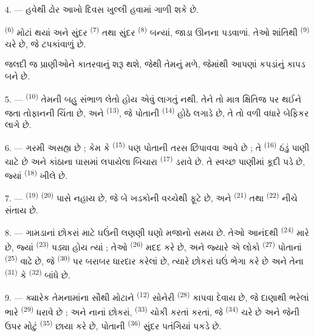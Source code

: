4. --- હવેથી ઢોર આખો દિવસ ખુલ્લી હવામાં ગાળી શકે છે.

 \textsuperscript{(6)} મોટાં થયાં અને સુંદર
 \textsuperscript{(7)} તથા સુંદર 
\textsuperscript{(8)} બન્યાં, જાડા ઊનના પડવાળાં. તેઓ શાંતિથી
 \textsuperscript{(9)}  ચરે છે, જે
 ટપકાંવાળું છે.

જલદી જ  પ્રાણીઓને કાતરવાનું શરૂ થશે, જેથી તેમનું 
મળે, જેમાંથી આપણાં કપડાંનું કાપડ બને છે.

\VUsaut{5.0mm}
\VUsaut{3.4mm}

5. ---  \textsuperscript{(10)} તેમની બહુ સંભાળ લેતો હોય
એવું લાગતું નથી. તેને તો માત્ર ક્ષિતિજ પર થઈને જતા તોફાનની ચિંતા છે, અને
 \textsuperscript{(13)}, જે પોતાની
 \textsuperscript{(14)} હોઠે લગાડે છે, તે તો વળી વધારે
બેફિકર લાગે છે.

6. --- ગરમી અસહ્ય છે ; કેમ કે  \textsuperscript{(15)} પણ
પોતાની તરસ છિપાવવા આવે છે ; તે  \textsuperscript{(16)}
ઠંડું પાણી ચાટે છે અને કાંઠાના ઘાસમાં લપાયેલા બિચારા 
\textsuperscript{(17)} ડરાવે છે. તે સ્વચ્છ પાણીમાં કૂદી પડે છે, જ્યાં
 \textsuperscript{(18)} ખીલે છે.

7. ---  \textsuperscript{(19)} 
\textsuperscript{(20)} પાસે નહાય છે, જે બે ખડકોની વચ્ચેથી ફૂટે છે, અને
 \textsuperscript{(21)} તથા  \textsuperscript{(22)} નીચે સંતાય છે.

\VUsaut{5.0mm}
\VUsaut{3.4mm}

8. --- ગામડાનાં છોકરાં માટે ઘઉંની લણણી ઘણો મજાનો સમય છે. તેઓ આનંદથી
 \textsuperscript{(24)} મારે છે, જ્યાં  \textsuperscript{(23)} પડ્યા હોય ત્યાં ; તેઓ 
\textsuperscript{(26)} મદદ કરે છે, અને જ્યારે એ લોકો 
\textsuperscript{(27)} પોતાનાં 
\textsuperscript{(25)} વાઢે છે, જે 
\textsuperscript{(30)} પર બરાબર ધારદાર કરેલાં છે, ત્યારે છોકરાં ઘઉં ભેગા
કરે છે અને તેના  \textsuperscript{(31)} કે 
\textsuperscript{(32)} બાંધે છે.

9. --- ક્યારેક તેમનામાંના સૌથી મોટાને 
\textsuperscript{(12)} સોનેરી  \textsuperscript{(28)} કાપવા
દેવાય છે, જે દાણાથી ભરેલાં ભારે  \textsuperscript{(29)}
ધરાવે છે ; અને નાનાં છોકરાં,  \textsuperscript{(33)} ચોકી
કરતાં કરતાં, જે  \textsuperscript{(34)} ચરે છે અને જેની
ઉપર મોટું  \textsuperscript{(35)} છાયા કરે છે,
પોતાની  \textsuperscript{(36)} સુંદર પતંગિયાં પકડે છે.

